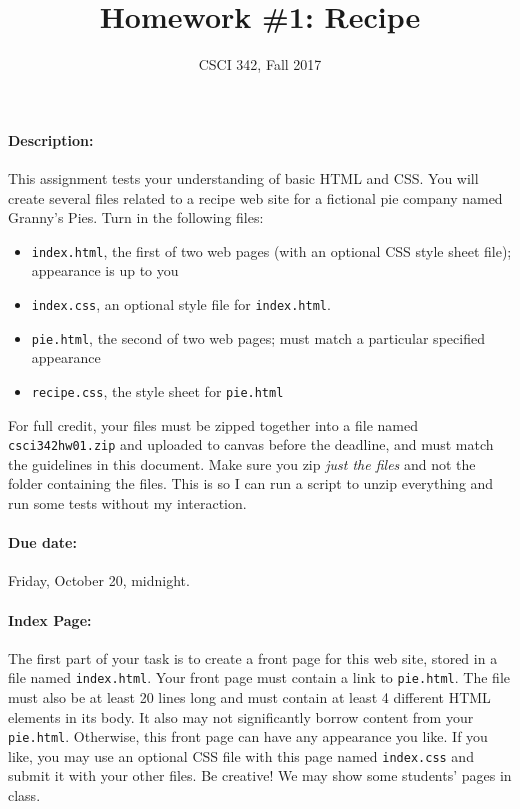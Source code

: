 \documentclass{article}
\title{Homework \#1: Recipe}
\author{CSCI 342, Fall 2017}
\begin{document}
\maketitle



\paragraph{Description:}
  This assignment tests your understanding of basic HTML and CSS. You
will create several files related to a recipe web site for a fictional
pie company named Granny's Pies. Turn in the following files:
\begin{itemize}
\item \verb|index.html|, the first of two web pages (with an optional
  CSS style sheet file); appearance is up to you
\item \verb|index.css|, an optional style file for \verb|index.html|.
\item \verb|pie.html|, the second of two web pages; must match a
  particular specified appearance
\item \verb|recipe.css|, the style sheet for \verb|pie.html|
\end{itemize}
For full credit, your files must be zipped together into a file named
\verb|csci342hw01.zip| and uploaded to canvas before the deadline, and
must match the guidelines in this document.  Make sure you zip {\em
  just the files} and not the folder containing the files. This is so
I can run a script to unzip everything and run some tests without my
interaction.

\paragraph{Due date:} Friday, October 20, midnight.


\paragraph{Index Page:} The first part of your task is to create a front
  page for this web site, stored in a file named
  \verb|index.html|. Your front page must contain a link to
  \verb|pie.html|. The file must also be at least 20 lines long and
  must contain at least 4 different HTML elements in its body. It also
  may not significantly borrow content from your
  \verb|pie.html|. Otherwise, this front page can have any appearance
  you like. If you like, you may use an optional CSS file with this
  page named \verb|index.css| and submit it with your other files. Be
  creative! We may show some students' pages in class.
\end{document}
